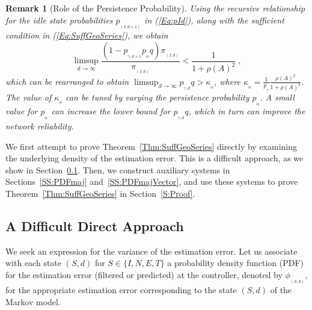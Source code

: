 \documentclass[twocolumn]{autart}
\newtheorem{remark}{Remark}[section]
\begin{document}
\begin{remark}[Role of the Persistence Probability]
Using the recursive relationship for the idle state probabilities $p_{_{(I,d+1)}}$ in (\ref{Eq:pId}), along with the sufficient condition in (\ref{Eq:SuffGeoSeries}), we obtain
\begin{equation*}
\limsup_{d \to \infty} \frac{(1-p_{_{\gamma,d+1}} p_{_{\alpha}} q) \pi_{_{(I,d)}}}{\pi_{_{(I,d)}}} < \frac{1}{1+\rho(A)^2} \; ,
\end{equation*}
which can be rearranged to obtain $\limsup_{d \to \infty} p_{_{\gamma,d}} q > \kappa_{_{\alpha}}$, where $\kappa_{_{\alpha}} = \frac{1}{p_{_{\alpha}}} \frac{\rho(A)^2}{1+\rho(A)^2}$. The value of $\kappa_{_{\alpha}}$ can be tuned by varying the persistence probability $p_{_{\alpha}}$. A small value for $p_{_{\alpha}}$ can increase the lower bound for $p_{_{\gamma,d}} q$, which in turn can improve the network reliability.
\end{remark}

We first attempt to prove Theorem~\ref{Thm:SuffGeoSeries} directly by examining the underlying density of the estimation error. This is a difficult approach, as we show in Section~\ref{SS:PDFevolve}. Then, we construct auxiliary systems in Sections~\ref{SS:PDFmaj} and~\ref{SS:PDFmajVector}, and use these systems to prove Theorem~\ref{Thm:SuffGeoSeries} in Section~\ref{S:Proof}.

\subsection{A Difficult Direct Approach} \label{SS:PDFevolve}
We seek an expression for the variance of the estimation error. Let us associate with each state $(S,d)$ for $S \in \{I,N,E,T\}$ a probability density function (PDF) for the estimation error (filtered or predicted) at the controller, denoted by $\phi_{_{(S,d)}}$, for the appropriate estimation error corresponding to the state $(S,d)$ of the Markov model.
\end{document}
